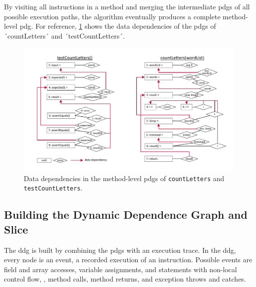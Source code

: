 By visiting all instructions in a method and merging the intermediate \acp{pdg} of all possible execution paths, the algorithm eventually produces a complete method-level \ac{pdg}.
For reference, \cref{fig:graph_static} shows the data dependencies of the \acp{pdg} of ´countLetters´ and ´testCountLetters´.

\begin{figure}[t]
\centering
\includegraphics[width=.90\linewidth, clip, trim=12mm 7mm 7mm 7mm]{img/graph_static}
\caption{Data dependencies in the method-level \aclp{pdg} of \lstinline+countLetters+ and \lstinline+testCountLetters+.}
\label{fig:graph_static}
\end{figure}

\subsection{Building the Dynamic Dependence Graph and Slice}




The \acf{ddg} is built by combining the \acfp{pdg} with an execution trace.
In the \ac{ddg}, every node is an event, a recorded execution of an instruction.
Possible events are field and array accesses, variable assignments, and statements with non-local control flow, \ie, method calls, method returns, and exception throws and catches.

